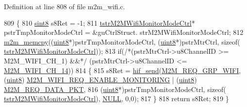 Definition at line 808 of file m2m\+\_\+wifi.\+c.


\begin{DoxyCode}
809 \{
810     \hyperlink{group__DataT_gae35f10ffd0ac8dd2bc3e794da9bdfbc7}{sint8}  s8Ret = -1;
811     \hyperlink{structtstrM2MWifiMonitorModeCtrl}{tstrM2MWifiMonitorModeCtrl}* pstrTmpMonitorModeCtrl = &guCtrlStruct.
      strM2MWifiMonitorModeCtrl;
812     \hyperlink{nm__common_8h_a62b30b611dfcc58e190254d1f663470a}{m2m\_memcpy}((\hyperlink{group__DataT_ga4df709a77647e870bbf1d955b8edc9a6}{uint8}*)pstrTmpMonitorModeCtrl, (\hyperlink{group__DataT_ga4df709a77647e870bbf1d955b8edc9a6}{uint8}*)pstrMtrCtrl, \textcolor{keyword}{sizeof}(
      \hyperlink{structtstrM2MWifiMonitorModeCtrl}{tstrM2MWifiMonitorModeCtrl}));
813     \textcolor{keywordflow}{if}(\textcolor{comment}{/*(pstrMtrCtrl->u8ChannelID >= M2M\_WIFI\_CH\_1) &&*/} (pstrMtrCtrl->u8ChannelID <= 
      \hyperlink{group__WlanEnums_gga2a91dd671e2672dba1a7ed45230f3a99a6421cfaf77ed29e91106d39e69e4a970}{M2M\_WIFI\_CH\_14}))
814     \{
815         s8Ret = \hyperlink{m2m__hif_8c_a13ba8ad11b2ac39516ca787386d16ce0}{hif\_send}(\hyperlink{nm__common_8h_a9ab02eb1aea02a75c3f5aade4eef1276aeb9a7d57324ba4b8a6c2a5f46dd499c2}{M2M\_REQ\_GRP\_WIFI}, (\hyperlink{group__DataT_ga4df709a77647e870bbf1d955b8edc9a6}{uint8})
      \hyperlink{group__WlanEnums_gga064de09dec1d5e88ed8d075fa40f57dea1a121c4c7263d80c2c02c4b87bb3aa0f}{M2M\_WIFI\_REQ\_ENABLE\_MONITORING} | (\hyperlink{group__DataT_ga4df709a77647e870bbf1d955b8edc9a6}{uint8})
      \hyperlink{nm__common_8h_a8f14623395b4e817613140afdf87fe6fa4ba55ee3c10f0b8175bba12f4b39a499}{M2M\_REQ\_DATA\_PKT},
816             (\hyperlink{group__DataT_ga4df709a77647e870bbf1d955b8edc9a6}{uint8}*)pstrTmpMonitorModeCtrl, \textcolor{keyword}{sizeof}(
      \hyperlink{structtstrM2MWifiMonitorModeCtrl}{tstrM2MWifiMonitorModeCtrl}), \hyperlink{group__BSPDefine_ga070d2ce7b6bb7e5c05602aa8c308d0c4}{NULL}, 0,0);
817     \}
818     \textcolor{keywordflow}{return} s8Ret;
819 \}
\end{DoxyCode}
